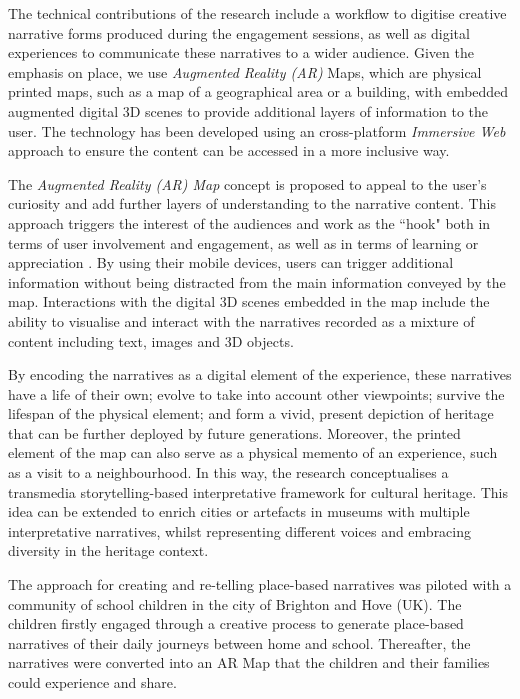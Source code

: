 \documentclass[acmlarge,screen,dvipsnames]{acmart}
\begin{document}
The technical contributions of the research include a workflow to digitise creative narrative forms produced during the engagement sessions, as well as digital experiences to communicate these narratives to a wider audience. Given the emphasis on place, we use \emph{Augmented Reality (AR)} Maps, which are physical printed
maps, such as a map of a geographical area or a building, with embedded augmented digital 3D scenes to provide additional layers of information to the user. The technology has been developed using an
cross-platform \emph{Immersive Web} approach to ensure the content can be accessed in a more inclusive way.  

The \emph{Augmented Reality (AR) Map} concept is proposed to appeal to the
user's curiosity and add further layers of understanding to the narrative content. This approach triggers the interest of the audiences and work as the ``hook" both in terms of user involvement and engagement, as well as in terms of learning or appreciation \cite{Csikszentmihalyi1995}. By using their mobile devices, users can trigger additional
information without being distracted from the main information conveyed by the
map. Interactions with the digital 3D scenes embedded in the map include
the ability to visualise and interact with the narratives
recorded as a mixture of content including text, images and 3D objects.    

By encoding the narratives as a digital element of the experience, these
narratives have a life of their own; evolve to take into account
other viewpoints; survive the lifespan of the physical element; and form
a vivid, present depiction of heritage that can be further deployed by future
generations. Moreover, the printed element of the map can also serve as a physical
memento of an experience, such as a visit to a neighbourhood. In this
way, the research conceptualises a transmedia storytelling-based
interpretative framework for cultural heritage. This idea can be
extended to enrich cities or artefacts in museums with multiple
interpretative narratives, whilst representing different voices and embracing
diversity in the heritage context.

The approach for creating and re-telling place-based narratives was
piloted with a community of school children in the city of Brighton and
Hove (UK). The children firstly engaged through a creative process to generate place-based narratives of their
daily journeys between home and school. Thereafter, the narratives were
converted into an AR Map that the children and their families could
experience and share.
\end{document}

